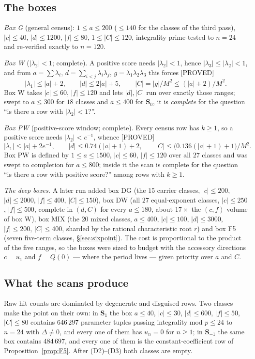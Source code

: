 \documentclass[11pt,reqno]{amsart}
\theoremstyle{plain}
\theoremstyle{definition}
\theoremstyle{remark}
\theoremstyle{plain}
\newcommand{\Proved}{\textup{\textsf{[PROVED]}}}
\begin{document}
\subsection{The boxes}\label{sec:boxes}
\emph{Box G} (general census): $1\le a\le200$ ($\le140$ for the classes of the
third pass), $|c|\le40$, $|d|\le1200$, $|f|\le80$, $1\le|C|\le120$, integrality
prime-tested to $n=24$ and re-verified exactly to $n=120$.

\emph{Box W} ($|\lambda_2|<1$; complete). A positive score needs
$|\lambda_2|<1$, hence $|\lambda_3|\le|\lambda_2|<1$, and from $a=\sum\lambda_i$,
$d=\sum_{i<j}\lambda_i\lambda_j$, $g=\lambda_1\lambda_2\lambda_3$ this forces
\Proved
\[
|\lambda_1|\le|a|+2,\qquad |d|\le2|a|+5,\qquad |C|=|g|/M^2\le(|a|+2)/M^2 .
\]
Box W takes $|c|\le60$, $|f|\le120$ and lets $|d|,|C|$ run over exactly those
ranges; swept to $a\le300$ for $18$ classes and $a\le400$ for $\mathbf S_0$, it
is \emph{complete} for the question ``is there a row with $|\lambda_2|<1$?''.

\emph{Box PW} (positive-score window; complete). Every census row has $k\ge1$, so
a positive score needs $|\lambda_2|<e^{-1}$, whence \Proved
\[
|\lambda_1|\le|a|+2e^{-1},\qquad |d|\le0.74(|a|+1)+2,\qquad
|C|\le\bigl(0.136(|a|+1)+1\bigr)/M^2 .
\]
Box PW is defined by $1\le a\le1500$, $|c|\le60$, $|f|\le120$ over all $27$
classes and was swept to completion for $a\le800$; inside it the scan is complete
for the question ``is there a row with positive score?'' among rows with
$k\ge1$.

\emph{The deep boxes.} A later run added box DG (the $15$ carrier classes,
$|c|\le200$, $|d|\le2000$, $|f|\le400$, $|C|\le150$), box DW (all $27$
equal-exponent classes, $|c|\le250$, $|f|\le500$, complete in $(d,C)$ for every
$a\le180$, about $17\times$ the $(c,f)$ volume of box W), box MIX (the $20$ mixed
classes, $a\le400$, $|c|\le100$, $|d|\le3000$, $|f|\le200$, $|C|\le400$, sharded
by the rational characteristic root $r$) and box F5 (seven five-term classes,
\S\ref{sec:sixpoint}). The cost is proportional to the product of the five
ranges, so the boxes were sized to budget with the accessory directions $c=u_1$
and $f=Q(0)$ --- where the period lives --- given priority over $a$ and $C$.

\subsection{What the scans produce}\label{sec:scanshape}
Raw hit counts are dominated by degenerate and disguised rows. Two classes make
the point on their own: in $\mathbf S_1$ the box $a\le40$, $|c|\le30$,
$|d|\le600$, $|f|\le50$, $|C|\le80$ contains $646\,297$ parameter tuples passing
integrality mod $p\le24$ to $n=24$ with $\Delta\ne0$, and every one of them has
$u_n=0$ for $n\ge1$; in $\mathbf S_{-1}$ the same box contains $484\,697$, and
every one of them is the constant-coefficient row of Proposition~\ref{prop:F5}.
After (D2)--(D3) both classes are empty.
\end{document}
